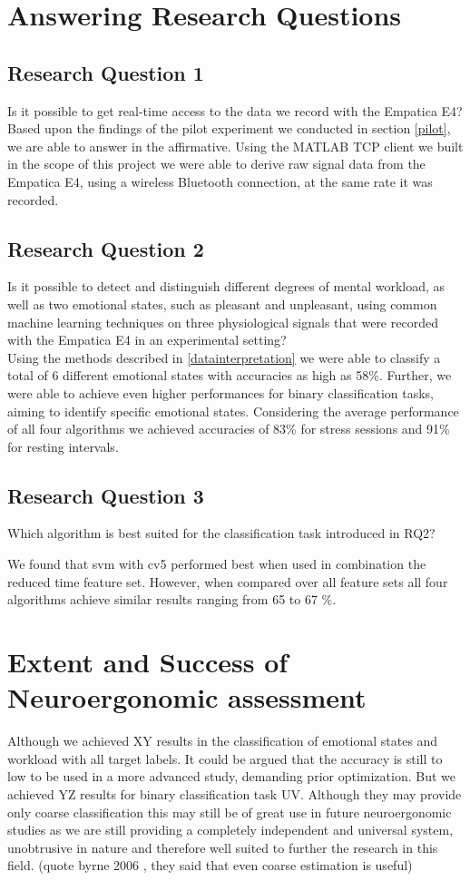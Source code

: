\section{Answering Research Questions}
\subsection{Research Question 1} 
Is it possible to get real-time access to the data we record with the Empatica E4?\\[10pt]
Based upon the findings of the pilot experiment we conducted in section \ref{pilot}, we are able to answer in the affirmative. Using the MATLAB TCP client we built in the scope of this project we were able to derive raw signal data from the Empatica E4, using a wireless Bluetooth connection, at the same rate it was recorded.

\subsection{Research Question 2}  
Is it possible to detect and distinguish different degrees of mental workload, as well as two emotional states, such as pleasant and unpleasant, using common machine learning techniques on three physiological signals that were recorded with the Empatica E4 in an experimental setting?\\[10pt]
Using the methods described in \ref{datainterpretation} we were able to classify a total of 6 different emotional states with accuracies as high as 58\%. 
Further, we were able to achieve even higher performances for binary classification tasks, aiming to identify specific emotional states. Considering the average performance of all four algorithms we achieved accuracies of 83\% for stress sessions and 91\% for resting intervals. 
\subsection{Research Question 3}  
Which algorithm is best suited for the classification task introduced in RQ2?

We found that svm with cv5 performed best when used in combination the reduced time feature set. However, when compared over all feature sets all four algorithms achieve similar results ranging from 65 to 67 \%.

\section{Extent and Success of Neuroergonomic assessment}
Although we achieved XY results in the classification of emotional states and workload with all target labels. It could be argued that the accuracy is still to low to be used in a more advanced study, demanding prior optimization.
But we achieved YZ results for binary classification task UV. Although they may provide only coarse classification this may still be of great use in future neuroergonomic studies as we are still providing a completely independent and universal system, unobtrusive in nature and therefore well suited to further the research in this field. (quote byrne 2006 , they said that even coarse estimation is useful)

